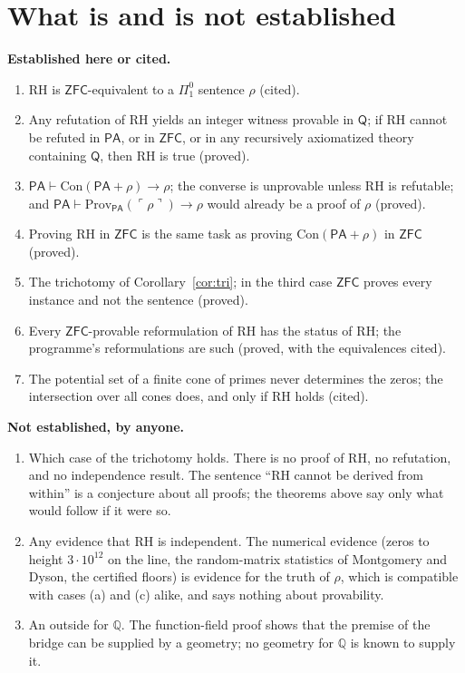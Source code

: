 \documentclass[11pt]{article}
\theoremstyle{definition}
\theoremstyle{remark}
\newcommand{\Q}{\mathbb Q}
\newcommand{\PA}{\mathsf{PA}}
\newcommand{\ZFC}{\mathsf{ZFC}}
\newcommand{\RA}{\mathsf{Q}}
\newcommand{\Prov}{\mathrm{Prov}}
\newcommand{\Con}{\mathrm{Con}}
\newcommand{\RH}{\mathrm{RH}}
\newcommand{\gn}[1]{\ulcorner #1\urcorner}
\newcommand{\Pione}{\Pi^0_1}
\begin{document}
\section{What is and is not established}\label{sec:limits}

\textbf{Established here or cited.}
\begin{enumerate}
\item $\RH$ is $\ZFC$-equivalent to a $\Pione$ sentence $\rho$ (cited).
\item Any refutation of $\RH$ yields an integer witness provable in $\RA$; if $\RH$ cannot be refuted in $\PA$, or in $\ZFC$, or in any recursively axiomatized theory containing $\RA$, then $\RH$ is true (proved).
\item $\PA\vdash\Con(\PA+\rho)\to\rho$; the converse is unprovable unless $\RH$ is refutable; and $\PA\vdash\Prov_\PA(\gn\rho)\to\rho$ would already be a proof of $\rho$ (proved).
\item Proving $\RH$ in $\ZFC$ is the same task as proving $\Con(\PA+\rho)$ in $\ZFC$ (proved).
\item The trichotomy of Corollary~\ref{cor:tri}; in the third case $\ZFC$ proves every instance and not the sentence (proved).
\item Every $\ZFC$-provable reformulation of $\RH$ has the status of $\RH$; the programme's reformulations are such (proved, with the equivalences cited).
\item The potential set of a finite cone of primes never determines the zeros; the intersection over all cones does, and only if $\RH$ holds (cited).
\end{enumerate}

\textbf{Not established, by anyone.}
\begin{enumerate}
\item Which case of the trichotomy holds. There is no proof of $\RH$, no refutation, and no independence result. The sentence ``$\RH$ cannot be derived from within'' is a conjecture about all proofs; the theorems above say only what would follow if it were so.
\item Any evidence that $\RH$ is independent. The numerical evidence (zeros to height $3\cdot10^{12}$ on the line, the random-matrix statistics of Montgomery and Dyson, the certified floors) is evidence for the truth of $\rho$, which is compatible with cases (a) and (c) alike, and says nothing about provability.
\item An outside for $\Q$. The function-field proof shows that the premise of the bridge can be supplied by a geometry; no geometry for $\Q$ is known to supply it.
\end{enumerate}
\end{document}
